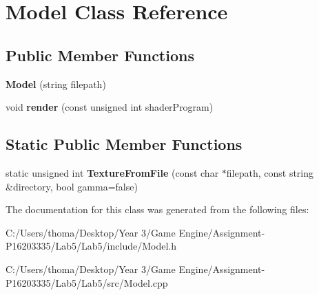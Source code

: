 \hypertarget{class_model}{}\section{Model Class Reference}
\label{class_model}
\subsection*{Public Member Functions}
\begin{DoxyCompactItemize}
\item 
\mbox{\label{class_model_a4a90abd11a1c4e47f1b704e28e147dfb}} 
{\bfseries Model} (string filepath)
\item 
\mbox{\label{class_model_a0885da76930d0f3b919eaa10ae08e8ab}} 
void {\bfseries render} (const unsigned int shader\+Program)
\end{DoxyCompactItemize}
\subsection*{Static Public Member Functions}
\begin{DoxyCompactItemize}
\item 
\mbox{\label{class_model_a1e120218f311ce8e41423189cae3d472}} 
static unsigned int {\bfseries Texture\+From\+File} (const char $\ast$filepath, const string \&directory, bool gamma=false)
\end{DoxyCompactItemize}


The documentation for this class was generated from the following files\+:\begin{DoxyCompactItemize}
\item 
C\+:/\+Users/thoma/\+Desktop/\+Year 3/\+Game Engine/\+Assignment-\/\+P16203335/\+Lab5/\+Lab5/include/Model.\+h\item 
C\+:/\+Users/thoma/\+Desktop/\+Year 3/\+Game Engine/\+Assignment-\/\+P16203335/\+Lab5/\+Lab5/src/Model.\+cpp\end{DoxyCompactItemize}

